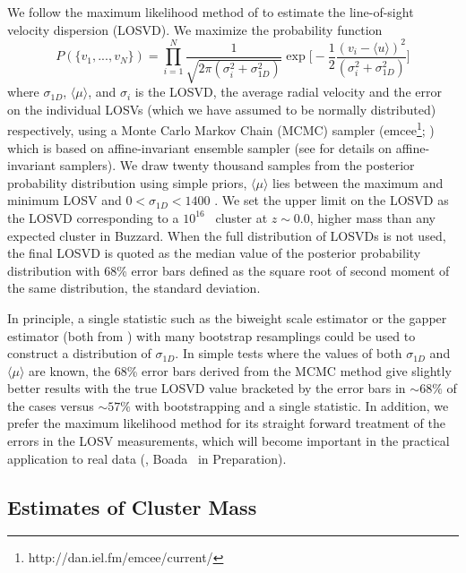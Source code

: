 \documentclass[fleqn,usenatbib]{mnras}
\begin{document}
We follow the maximum likelihood method of \cite{Walker2006} to estimate the line-of-sight velocity dispersion (LOSVD). We maximize the probability function 
\begin{equation}\label{eq: jointGaussian}
P(\{v_1, ..., v_N\})=\displaystyle\prod_{i=1}^{N}\frac{1}{\sqrt{2\pi(\sigma_i^2+\sigma_{1D}^2)}}\exp\biggl[-\frac{1}{2}\frac{(v_i-\langle u \rangle)^2}{(\sigma_i^2+\sigma_{1D}^2)}\biggr]
\end{equation}
where $\sigma_{1D}$, $\langle\mu\rangle$, and $\sigma_i$ is the LOSVD, the average radial velocity and the error on the individual LOSVs (which we have assumed to be normally distributed) respectively, using a Monte Carlo Markov Chain (MCMC) sampler ({\sc emcee}\footnote{http://dan.iel.fm/emcee/current/}; \citealt{Foreman-Mackey2013}) which is based on affine-invariant ensemble sampler (see \citealt{Goodman2010} for details on affine-invariant samplers). We draw twenty thousand samples from the posterior probability distribution using simple priors, $\langle\mu\rangle$ lies between the maximum and minimum LOSV and $0< \sigma_{1D} < 1400$ \kms. We set the upper limit on the LOSVD as the LOSVD corresponding to a $10^{16}$ \Msol\ cluster at $z\sim0.0$, higher mass than any expected cluster in Buzzard. When the full distribution of LOSVDs is not used, the final LOSVD is quoted as the median value of the posterior probability distribution with 68\% error bars defined as the square root of second moment of the same distribution, the standard deviation.

In principle, a single statistic such as the biweight scale estimator or the gapper estimator (both from \citealt{Beers1990}) with many bootstrap resamplings could be used to construct a distribution of $\sigma_{1D}$. In simple tests where the values of both $\sigma_{1D}$ and $\langle\mu\rangle$ are known, the 68\% error bars derived from the MCMC method give slightly better results with the true LOSVD value bracketed by the error bars in $\sim68\%$ of the cases versus $\sim57\%$ with bootstrapping and a single statistic. In addition, we prefer the maximum likelihood method for its straight forward treatment of the errors in the LOSV measurements, which will become important in the practical application to real data (\eg, Boada \etal\ in Preparation).

\subsection{Estimates of Cluster Mass}\label{sec: mass}
\end{document}
